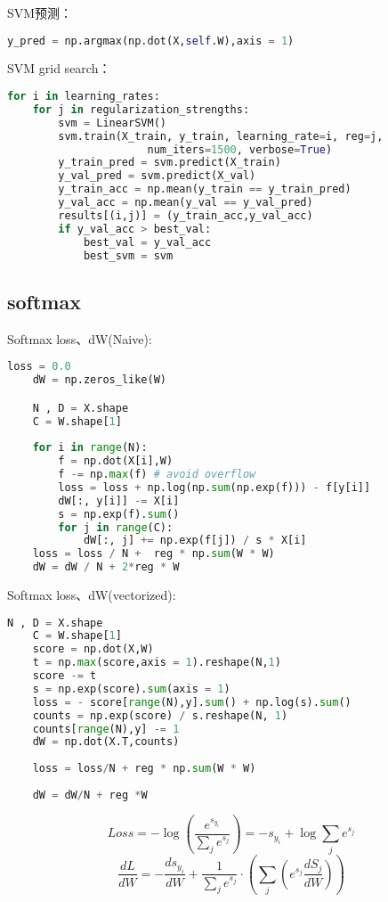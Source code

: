 \documentclass[a4paper]{article}
\begin{document}
SVM预测：
\begin{lstlisting}[language=Python, caption=SVM预测]
    y_pred = np.argmax(np.dot(X,self.W),axis = 1)
\end{lstlisting}

SVM grid search：
\begin{lstlisting}[language=Python, caption=SVM grid search]
    for i in learning_rates:
    for j in regularization_strengths:
        svm = LinearSVM()
        svm.train(X_train, y_train, learning_rate=i, reg=j,
                      num_iters=1500, verbose=True)
        y_train_pred = svm.predict(X_train) 
        y_val_pred = svm.predict(X_val)
        y_train_acc = np.mean(y_train == y_train_pred)
        y_val_acc = np.mean(y_val == y_val_pred)
        results[(i,j)] = (y_train_acc,y_val_acc)
        if y_val_acc > best_val:
            best_val = y_val_acc
            best_svm = svm
\end{lstlisting}

\subsection{softmax}

Softmax loss、dW(Naive):
\begin{lstlisting}[language=Python, caption=Softmax(Naive)]
    loss = 0.0
    dW = np.zeros_like(W)

    N , D = X.shape
    C = W.shape[1]
    
    for i in range(N):
        f = np.dot(X[i],W)
        f -= np.max(f) # avoid overflow
        loss = loss + np.log(np.sum(np.exp(f))) - f[y[i]]
        dW[:, y[i]] -= X[i]
        s = np.exp(f).sum()
        for j in range(C):
            dW[:, j] += np.exp(f[j]) / s * X[i]
    loss = loss / N +  reg * np.sum(W * W)
    dW = dW / N + 2*reg * W
\end{lstlisting}
Softmax loss、dW(vectorized):
\begin{lstlisting}[language=Python, caption=Softmax(vectorized)]
    N , D = X.shape
    C = W.shape[1]
    score = np.dot(X,W)
    t = np.max(score,axis = 1).reshape(N,1)
    score -= t
    s = np.exp(score).sum(axis = 1)
    loss = - score[range(N),y].sum() + np.log(s).sum()
    counts = np.exp(score) / s.reshape(N, 1)
    counts[range(N),y] -= 1
    dW = np.dot(X.T,counts)
    
    loss = loss/N + reg * np.sum(W * W)
    
    dW = dW/N + reg *W
\end{lstlisting}
$$ Loss = -\log (\frac{e^{s_{y_i}}}{\sum_j e^{s_{j}}})  = -s_{y_i} + \log \sum_j e^{s_{j}}$$
$$ \frac{d L}{d W} = - \frac{d s_{y_i}}{d W}+\frac{1}{\sum_j e^{s_{j}}} \cdot (\sum_j(e^{s_{j}} \frac{d S_j}{d W}))$$
\end{document}
